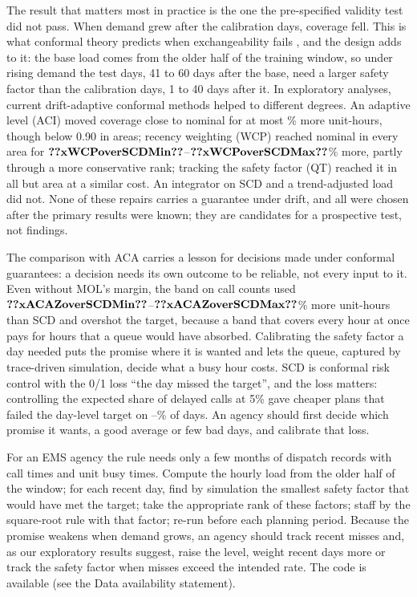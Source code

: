 \documentclass[12pt]{article}
\begin{document}
The result that matters most in practice is the one the pre-specified validity test did not pass. When demand grew after the calibration days, coverage fell. This is what conformal theory predicts when exchangeability fails \citep{barber2023beyond}, and the design adds to it: the base load comes from the older half of the training window, so under rising demand the test days, 41 to 60 days after the base, need a larger safety factor than the calibration days, 1 to 40 days after it. In exploratory analyses, current drift-adaptive conformal methods helped to different degrees. An adaptive level (ACI) moved coverage close to nominal for at most \% more unit-hours, though below 0.90 in  areas; recency weighting (WCP) reached nominal in every area for $\res{xWCPoverSCDMin}$--$\res{xWCPoverSCDMax}$\% more, partly through a more conservative rank; tracking the safety factor (QT) reached it in all but  area at a similar cost. An integrator on SCD and a trend-adjusted load did not. None of these repairs carries a guarantee under drift, and all were chosen after the primary results were known; they are candidates for a prospective test, not findings.

The comparison with ACA carries a lesson for decisions made under conformal guarantees: a decision needs its own outcome to be reliable, not every input to it. Even without MOL's margin, the band on call counts used $\res{xACAZoverSCDMin}$--$\res{xACAZoverSCDMax}$\% more unit-hours than SCD and overshot the target, because a band that covers every hour at once pays for hours that a queue would have absorbed. Calibrating the safety factor a day needed puts the promise where it is wanted and lets the queue, captured by trace-driven simulation, decide what a busy hour costs. SCD is conformal risk control \citep{angelopoulos2024conformal} with the 0/1 loss ``the day missed the target'', and the loss matters: controlling the expected share of delayed calls at 5\% gave cheaper plans that failed the day-level target on --\% of days. An agency should first decide which promise it wants, a good average or few bad days, and calibrate that loss.

For an EMS agency the rule needs only a few months of dispatch records with call times and unit busy times. Compute the hourly load from the older half of the window; for each recent day, find by simulation the smallest safety factor that would have met the target; take the appropriate rank of these factors; staff by the square-root rule with that factor; re-run before each planning period. Because the promise weakens when demand grows, an agency should track recent misses and, as our exploratory results suggest, raise the level, weight recent days more or track the safety factor when misses exceed the intended rate. The code is available (see the Data availability statement).
\end{document}
